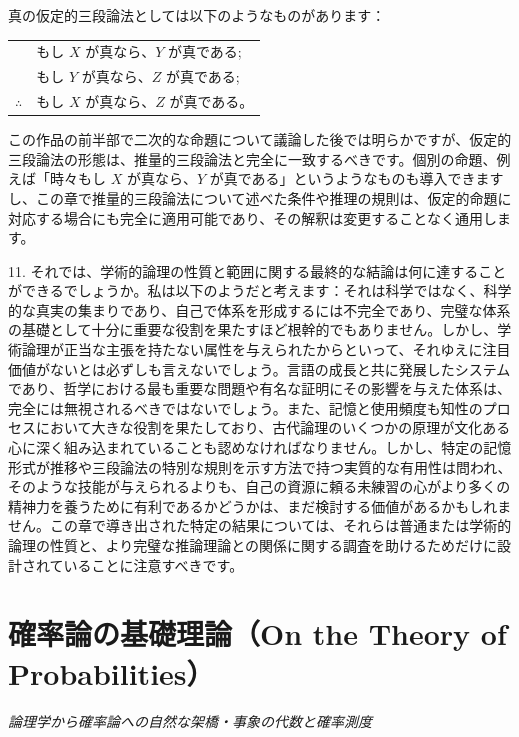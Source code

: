 \documentclass[a4paper,11pt,openany]{ltjsbook}
\begin{document}
真の仮定的三段論法としては以下のようなものがあります：

\begin{tabular}{rl}
            & もし $X$ が真なら、$Y$ が真である;   \\
            & もし $Y$ が真なら、$Z$ が真である;   \\
$\therefore$ & もし $X$ が真なら、$Z$ が真である。
\end{tabular}

この作品の前半部で二次的な命題について議論した後では明らかですが、仮定的三段論法の形態は、推量的三段論法と完全に一致するべきです。個別の命題、例えば「時々もし $X$ が真なら、$Y$ が真である」というようなものも導入できますし、この章で推量的三段論法について述べた条件や推理の規則は、仮定的命題に対応する場合にも完全に適用可能であり、その解釈は変更することなく通用します。

11. それでは、学術的論理の性質と範囲に関する最終的な結論は何に達することができるでしょうか。私は以下のようだと考えます：それは科学ではなく、科学的な真実の集まりであり、自己で体系を形成するには不完全であり、完璧な体系の基礎として十分に重要な役割を果たすほど根幹的でもありません。しかし、学術論理が正当な主張を持たない属性を与えられたからといって、それゆえに注目価値がないとは必ずしも言えないでしょう。言語の成長と共に発展したシステムであり、哲学における最も重要な問題や有名な証明にその影響を与えた体系は、完全には無視されるべきではないでしょう。また、記憶と使用頻度も知性のプロセスにおいて大きな役割を果たしており、古代論理のいくつかの原理が文化ある心に深く組み込まれていることも認めなければなりません。しかし、特定の記憶形式が推移や三段論法の特別な規則を示す方法で持つ実質的な有用性は問われ、そのような技能が与えられるよりも、自己の資源に頼る未練習の心がより多くの精神力を養うために有利であるかどうかは、まだ検討する価値があるかもしれません。この章で導き出された特定の結果については、それらは普通または学術的論理の性質と、より完璧な推論理論との関係に関する調査を助けるためだけに設計されていることに注意すべきです。

\newpage

\chapter{確率論の基礎理論（On the Theory of Probabilities）}
\label{ch:xvi}

\begin{center}
\large\textit{論理学から確率論への自然な架橋・事象の代数と確率測度}
\end{center}
\vspace{4mm}
\end{document}
